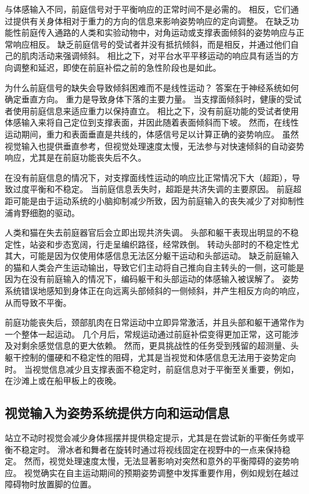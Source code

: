 与体感输入不同，前庭信号对于平衡响应的正常时间不是必需的。
相反，它们通过提供有关身体相对于重力的方向的信息来影响姿势响应的定向调整。
在缺乏功能性前庭传入通路的人类和实验动物中，对角运动或支撑表面倾斜的姿势响应与正常响应相反。
缺乏前庭信号的受试者并没有抵抗倾斜，而是相反，并通过他们自己的肌肉活动来强调倾斜。
相比之下，对平台水平平移运动的响应具有适当的方向调整和延迟，即使在前庭补偿之前的急性阶段也是如此。


为什么前庭信号的缺失会导致倾斜困难而不是线性运动？
答案在于神经系统如何确定垂直方向。
重力是导致身体下落的主要力量。
当支撑面倾斜时，健康的受试者使用前庭信息来适应重力以保持直立。
相比之下，没有前庭功能的受试者使用体感输入来将自己定位到支撑表面，并因此随着表面倾斜而下坡。
然而，在线性运动期间，重力和表面垂直是共线的，体感信号足以计算正确的姿势响应。
虽然视觉输入也提供垂直参考，但视觉处理速度太慢，无法参与对快速倾斜的自动姿势响应，尤其是在前庭功能丧失后不久。


在没有前庭信息的情况下，对支撑面线性运动的响应比正常情况下大（超距），导致过度平衡和不稳定。
当前庭信息丢失时，超距是共济失调的主要原因。
前庭超距可能是由于运动系统的小脑抑制减少所致，因为前庭输入的丧失减少了对抑制性浦肯野细胞的驱动。


人类和猫在失去前庭器官后会立即出现共济失调。
头部和躯干表现出明显的不稳定性，站姿和步态宽阔，行走呈编织路径，经常跌倒。
转动头部时的不稳定性尤其大，可能是因为仅使用体感信息无法区分躯干运动和头部运动。
缺乏前庭输入的猫和人类会产生运动输出，导致它们主动将自己推向自主转头的一侧，这可能是因为在没有前庭输入的情况下，编码躯干和头部运动的体感输入被误解了。
姿势系统错误地感知到身体正在向远离头部倾斜的一侧倾斜，并产生相反方向的响应，从而导致不平衡。


前庭功能丧失后，颈部肌肉在日常运动中立即异常激活，并且头部和躯干通常作为一个整体一起运动。
几个月后，常规运动通过前庭补偿变得更加正常，这可能涉及对剩余感觉信息的更大依赖。
然而，更具挑战性的任务受到残留的超测量、头躯干控制的僵硬和不稳定性的阻碍，尤其是当视觉和体感信息无法用于姿势定向时。
当视觉信息减少且支撑表面不稳定时，前庭信息对于平衡至关重要，例如，在沙滩上或在船甲板上的夜晚。



\subsection{视觉输入为姿势系统提供方向和运动信息}

站立不动时视觉会减少身体摇摆并提供稳定提示，尤其是在尝试新的平衡任务或平衡不稳定时。
滑冰者和舞者在旋转时通过将视线固定在视野中的一点来保持稳定。
然而，视觉处理速度太慢，无法显著影响对突然和意外的平衡障碍的姿势响应。
视觉确实在自主运动期间的预期姿势调整中发挥重要作用，例如规划在越过障碍物时放置脚的位置。


